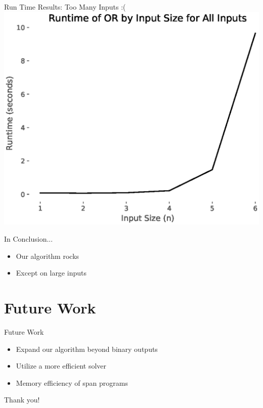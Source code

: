 \documentclass[12pt]{beamer}
\begin{document}
\begin{frame}{Run Time Results: Too Many Inputs :(}
\centering
\includegraphics[scale=.5]{or_all_runtime.eps}
\end{frame}

\begin{frame}{In Conclusion...}
    \begin{itemize}
        \item Our algorithm rocks
        \item Except on large inputs
    \end{itemize}
\end{frame}

\section{Future Work}
\begin{frame}{Future Work}
\begin{itemize}
    \item Expand our algorithm beyond binary outputs
    \item Utilize a more efficient solver
    \item Memory efficiency of span programs
\end{itemize}
\end{frame}

\begin{frame}{Thank you!}


\end{frame}
\end{document}
